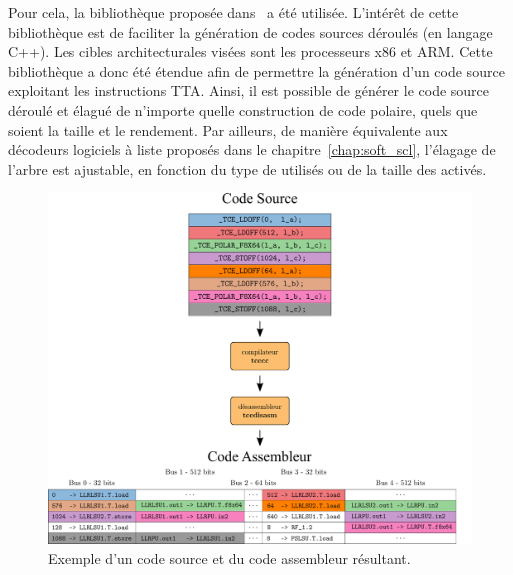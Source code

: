 Pour cela, la bibliothèque proposée dans~\cite{cassagne_efficient_2015} a été utilisée. L'intérêt de cette bibliothèque est de faciliter la génération de codes sources déroulés (en langage C++). Les cibles architecturales visées sont les processeurs x86 et ARM. Cette bibliothèque a donc été étendue afin de permettre la génération d'un code source exploitant les instructions TTA. Ainsi, il est possible de générer le code source déroulé et élagué de n'importe quelle construction de code polaire, quels que soient la taille et le rendement. Par ailleurs, de manière équivalente aux décodeurs logiciels à liste proposés dans le chapitre~\ref{chap:soft_scl}, l'élagage de l'arbre est ajustable, en fonction du type de \noeuds utilisés ou de la taille des \noeuds activés.


\begin{figure}[t]
\centering
\includegraphics[width=\textwidth]{main/ch4_fig/ilp_1}
\caption{Exemple d'un code source et du code assembleur résultant.}
\label{fig:ilp_1}
\end{figure}


